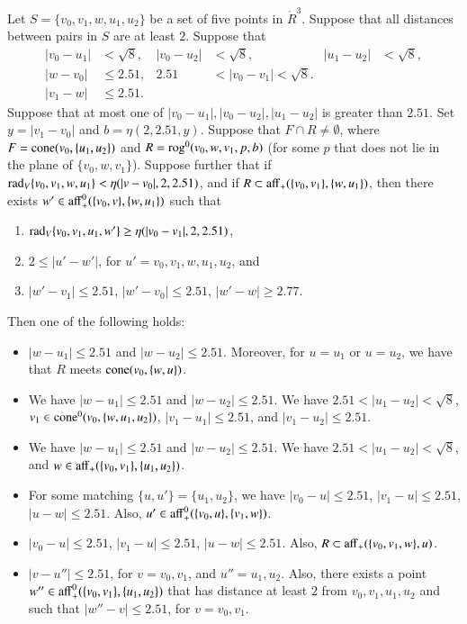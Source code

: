 \begin{lemma}
 Let $S=\{v_0,v_1,w,u_1,u_2\}$ be a set of five points
in $\ring{R}^3$.  
Suppose that all distances between pairs in $S$ are at least $2$.
Suppose that 
   $$
   \begin{array}{rlrlrll}
   |v_0-u_1|&<\sqrt8,& |v_0-u_2|&<\sqrt8,& |u_1-u_2|&<\sqrt8,\\
   |w-v_0|&\le 2.51, &2.51&<|v_0-v_1|<\sqrt8.\\
   |v_1-w|&\le 2.51.
   \end{array}
   $$
Suppose that at most one of $|v_0-u_1|,|v_0-u_2|,|u_1-u_2|$ is
greater than $2.51$.
%
Set $y=|v_1-v_0|$ and $b=\eta(2,2.51,y)$.
Suppose that $F\cap R\ne\emptyset$, 
where $F={\operatorname{cone}}(v_0,\{u_1,u_2\})$ and
$R={\operatorname{rog}}^0(v_0,w,v_1,p,b)$ (for some $p$ that
does not lie in the plane of $\{v_0,w,v_1\}$).
Suppose further 
that if $\operatorname{rad}_V\{v_0,v_1,w,u_1\} < \eta(|v-v_0|,2,2.51)$, 
and if $R\subset {\operatorname{aff}}_+(\{v_0,v_1\},\{w,u_1\})$,
then there exists
$w'\in{\operatorname{aff}}_+^0(\{v_0,v\},\{w,u_1\})$ such that 
  \begin{enumerate}
  \item $\operatorname{rad}_V\{v_0,v_1,u_1,w'\} \ge \eta(|v_0-v_1|,2,2.51)$, 
  \item $2\le |u'-w'|$, for $u'=v_0,v_1,w,u_1,u_2$, and
  \item $|w'-v_1|\le 2.51$, $|w'-v_0|\le 2.51$, $|w'-w|\ge 2.77$.
  \end{enumerate}
Then one of the following holds:
  \begin{itemize}
  \item
  $|w-u_1|\le 2.51$ and  $|w-u_2|\le 2.51$.
  Moreover, for $u=u_1$ or $u=u_2$, we have that
  $R$ meets ${\operatorname{cone}}(v_0,\{w,u\})$.
  \item  We have $|w-u_1|\le 2.51$ and  $|w-u_2|\le 2.51$.
  We have $2.51<|u_1-u_2|<\sqrt8$, 
  $v_1\in{\operatorname{cone}}^0(v_0,\{w,u_1,u_2\})$, 
  $|v_1-u_1|\le 2.51$, and $|v_1-u_2|\le 2.51$.
  \item  We have $|w-u_1|\le 2.51$ and  $|w-u_2|\le 2.51$.
  We have $2.51<|u_1-u_2|<\sqrt8$, and 
  $w\in{\operatorname{aff}}_+(\{v_0,v_1\},\{u_1,u_2\})$.
  \item For some matching $\{u,u'\}=\{u_1,u_2\}$, we have
  $|v_0-u|\le 2.51$, $|v_1-u|\le 2.51$, $|u-w|\le 2.51$.
   Also, $u'\in {\operatorname{aff}}_+^0(\{v_0,u\},\{v_1,w\})$.
  \item $|v_0-u|\le 2.51$, $|v_1-u|\le 2.51$, $|u-w|\le 2.51$.
  Also, $R\subset {\operatorname{aff}}_+(\{v_0,v_1,w\},u)$.
  \item $|v-u''|\le 2.51$, for $v=v_0,v_1$, and $u''=u_1,u_2$.  Also,
   there exists a point $w''\in{\operatorname{aff}}_+^0(\{v_0,v_1\},\{u_1,u_2\})$ 
   that has distance at least $2$ from
   $v_0,v_1,u_1,u_2$ and such that
   $|w''-v|\le 2.51$, for $v=v_0,v_1$.
  \end{itemize}
\end{lemma}


